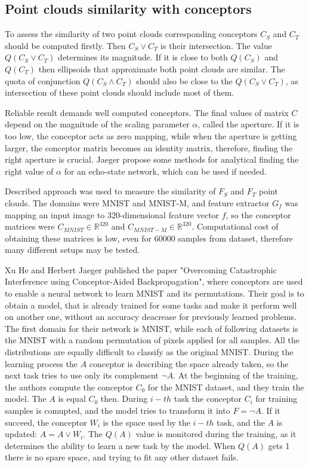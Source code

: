 \documentclass{article}
\begin{document}
\subsection{Point clouds similarity with conceptors}
To assess the similarity of two point clouds corresponding conceptors $C_{S}$ and $C_{T}$ should be computed firstly. Then $C_{S} \vee C_{T}$ is their intersection. The value $Q(C_{S} \vee C_{T})$ determines its magnitude. If it is close to both $Q(C_{S})$ and $Q(C_{T})$ then ellipsoids that approximate both point clouds are similar. The quota of conjunction $Q(C_{S} \wedge C_{T})$ should also be close to the $Q(C_{S} \vee C_{T})$, as intersection of these point clouds should include most of them.
\par
Reliable result demands well computed conceptors. The final values of matrix $C$ depend on the magnitude of the scaling parameter $\alpha$, called the aperture. If it is too low, the conceptor acts as zero mapping, while when the aperture is getting larger, the conceptor matrix becomes an identity matrix, therefore, finding the right aperture is crucial. Jaeger propose some methods for analytical finding the right value of $\alpha$ for an echo-state network, which can be used if needed.
\par
Described approach was used to measure the similarity of $F_{S}$ and $F_{T}$ point clouds. The domains were MNIST and MNIST-M, and feature extractor $G_{f}$ was mapping an input image to 320-dimensional feature vector $f$, so the conceptor matrices were $C_{MNIST} \in \mathbb{R}^{320}$ and $C_{MNIST-M} \in \mathbb{R}^{320}$. Computational cost of obtaining these matrices is low, even for 60000 samples from dataset, therefore many different setups may be tested.
\par
Xu He and Herbert Jaeger published the paper "Overcoming Catastrophic Interference using Conceptor-Aided Backpropagation", where conceptors are used to enable a neural network to learn MNIST and its permutations. Their goal is to obtain a model, that is already trained for some tasks and make it perform well on another one, without an accuracy deacrease for previously learned problems. The first domain for their network is MNIST, while each of following datasets is the MNIST with a random permutation of pixels applied for all samples. All the distributions are equally difficult to classify as the original MNIST. During the learning process the $A$ conceptor is describing the space already taken, so the next task tries to use only its complement $\neg A$. At the beginning of the training, the authors compute the conceptor $C_{0}$ for the MNIST dataset, and they train the model. The $A$ is equal $C_{0}$ then. During $i-th$ task the conceptor $C_i$ for training samples is comupted, and the model tries to transform it into $F = \neg A$. If it succeed, the conceptor $W_{i}$ is the space used by the $i-th$ task, and the $A$ is updated: $A = A \vee W_{i}$. The $Q(A)$ value is monitored during the training, as it determines the ability to learn a new task by the model. When $Q(A)$ gets 1 there is no spare space, and trying to fit any other dataset fails. 
\end{document}
